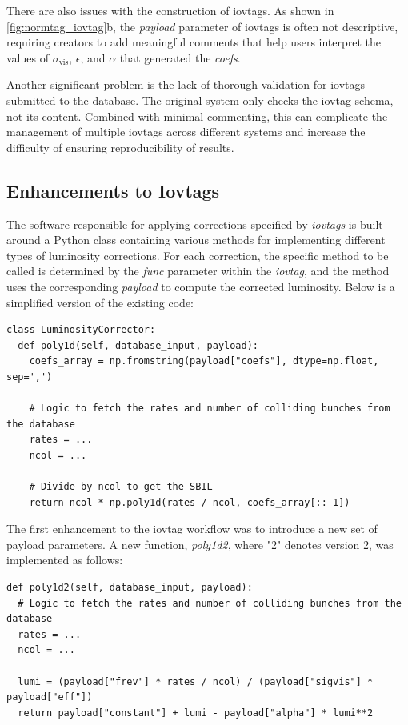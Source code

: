 There are also issues with the construction of iovtags. As shown in \autoref{fig:normtag_iovtag}b, the \textit{payload} parameter of iovtags is often not descriptive, requiring creators to add meaningful comments that help users interpret the values of $\sigma_{\text{vis}}$, $\epsilon$, and $\alpha$ that generated the \textit{coefs}.

Another significant problem is the lack of thorough validation for iovtags submitted to the database. The original system only checks the iovtag schema, not its content. Combined with minimal commenting, this can complicate the management of multiple iovtags across different systems and increase the difficulty of ensuring reproducibility of results.

\subsection{Enhancements to Iovtags}

The software responsible for applying corrections specified by \textit{iovtags} is built around a Python class containing various methods for implementing different types of luminosity corrections. For each correction, the specific method to be called is determined by the \textit{func} parameter within the \textit{iovtag}, and the method uses the corresponding \textit{payload} to compute the corrected luminosity. Below is a simplified version of the existing code:

\begin{lstlisting}
class LuminosityCorrector:
  def poly1d(self, database_input, payload):
    coefs_array = np.fromstring(payload["coefs"], dtype=np.float, sep=',')

    # Logic to fetch the rates and number of colliding bunches from the database
    rates = ...
    ncol = ...

    # Divide by ncol to get the SBIL
    return ncol * np.poly1d(rates / ncol, coefs_array[::-1])
\end{lstlisting}

The first enhancement to the iovtag workflow was to introduce a new set of payload parameters. A new function, \textit{poly1d2}, where "2" denotes version 2, was implemented as follows:

\begin{lstlisting}
def poly1d2(self, database_input, payload):
  # Logic to fetch the rates and number of colliding bunches from the database
  rates = ...
  ncol = ...

  lumi = (payload["frev"] * rates / ncol) / (payload["sigvis"] * payload["eff"])
  return payload["constant"] + lumi - payload["alpha"] * lumi**2
\end{lstlisting}


